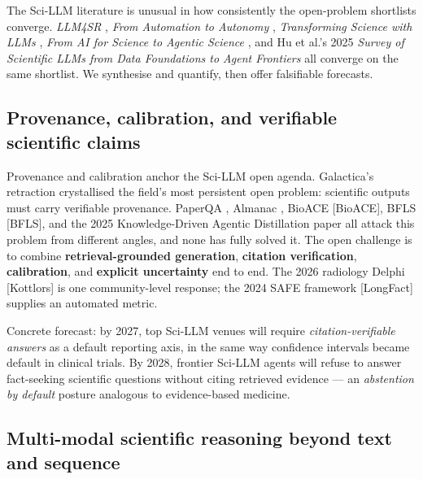 \documentclass{article}
\begin{document}
The Sci-LLM literature is unusual in how consistently the open-problem shortlists converge. \emph{LLM4SR} \cite{luo2025llm4srasurveyonlar}, \emph{From Automation to Autonomy} \cite{zheng2025fromautomationtoau}, \emph{Transforming Science with LLMs} \cite{eger2025transformingscienc}, \emph{From AI for Science to Agentic Science} \cite{wei2025fromaiforscienceto}, and Hu et al.'s 2025 \emph{Survey of Scientific LLMs from Data Foundations to Agent Frontiers} \cite{hu2025asurveyofscientifi} all converge on the same shortlist. We synthesise and quantify, then offer falsifiable forecasts.

\subsection{Provenance, calibration, and verifiable scientific claims}\label{provenance-calibration-and-verifiable-scientific-claims}

Provenance and calibration anchor the Sci-LLM open agenda. Galactica's retraction \cite{taylor2022arxiv2211090852022} crystallised the field's most persistent open problem: scientific outputs must carry verifiable provenance. PaperQA \cite{ala2023arxiv2312075592023}, Almanac \cite{zakka2024almanacretrievalau}, BioACE {[}BioACE{]}, BFLS {[}BFLS{]}, and the 2025 Knowledge-Driven Agentic Distillation paper \cite{xiao2025knowledgedrivenage} all attack this problem from different angles, and none has fully solved it. The open challenge is to combine \textbf{retrieval-grounded generation}, \textbf{citation verification}, \textbf{calibration}, and \textbf{explicit uncertainty} end to end. The 2026 radiology Delphi {[}Kottlors{]} is one community-level response; the 2024 SAFE framework {[}LongFact{]} supplies an automated metric.

Concrete forecast: by 2027, top Sci-LLM venues will require \emph{citation-verifiable answers} as a default reporting axis, in the same way confidence intervals became default in clinical trials. By 2028, frontier Sci-LLM agents will refuse to answer fact-seeking scientific questions without citing retrieved evidence --- an \emph{abstention by default} posture analogous to evidence-based medicine.

\subsection{Multi-modal scientific reasoning beyond text and sequence}\label{multi-modal-scientific-reasoning-beyond-text-and-sequence}
\end{document}
